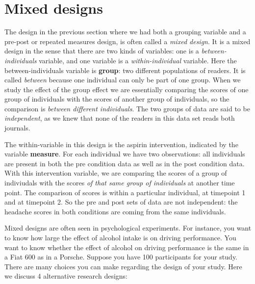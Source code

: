 \documentclass[]{book}\usepackage[]{graphicx}\usepackage[]{color}
\begin{document}
\section{Mixed designs}
The design in the previous section where we had both a grouping variable and a pre-post or repeated measures design, is often called a \textit{mixed design}. It is a mixed design in the sense that there are two kinds of variables: one is a \textit{between-individuals} variable, and one variable is a \textit{within-individual} variable. Here the between-individuals variable is \textbf{group}: two different populations of readers. It is called \textit{between} because one individual can only be part of one group. When we study the effect of the group effect we are essentially comparing the scores of one group of individuals with the scores of another group of individuals, so the comparison is \textit{between different individuals}. 
The two groups of data are said to be \textit{independent}, as we knew that none of the readers in this data set reads both journals. 

The within-variable in this design is the aspirin intervention, indicated by the variable \textbf{measure}. For each individual we have two observations: all individuals are present in both the pre condition data as well as in the post condition data. With this intervention variable, we are comparing the scores of a group of indiviudals with the scores \textit{of that same group of individuals} at another time point. The comparison of scores is within a particular individual, at timepoint 1 and at timepoint 2. So the pre and post sets of data are not independent: the headache scores in both conditions are coming from the same individuals. 

Mixed designs are often seen in psychological experiments. For instance, you want to know how large the effect of alcohol intake is on driving performance. You want to know whether the effect of alcohol on driving performance is the same in a Fiat 600 as in a Porsche. Suppose you have 100 participants for your study. There are many choices you can make regarding the design of your study. Here we discuss 4 alternative research designs:
\end{document}
